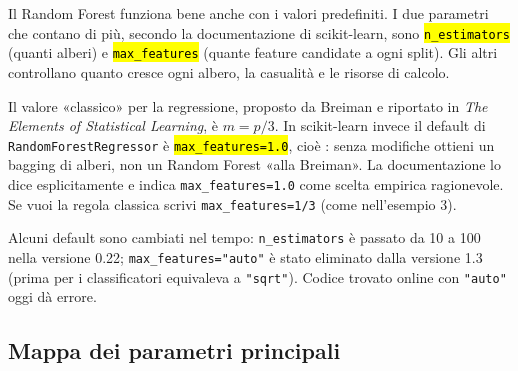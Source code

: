 
\begin{inbreve}
Il Random Forest funziona bene anche con i valori predefiniti. I due parametri che contano di più, secondo la documentazione di scikit-learn, sono \hl{\texttt{n\_estimators}} (quanti alberi) e \hl{\texttt{max\_features}} (quante feature candidate a ogni split). Gli altri controllano quanto cresce ogni albero, la casualità e le risorse di calcolo.
\end{inbreve}

\begin{attenzione}
Il valore «classico» per la regressione, proposto da Breiman e riportato in \emph{The Elements of Statistical Learning}, è $m=p/3$. In scikit-learn invece il default di \texttt{RandomForestRegressor} è \hl{\texttt{max\_features=1.0}}, cioè : senza modifiche ottieni un bagging di alberi, non un Random Forest «alla Breiman». La documentazione lo dice esplicitamente e indica \texttt{max\_features=1.0} come scelta empirica ragionevole. Se vuoi la regola classica scrivi \texttt{max\_features=1/3} (come nell'esempio 3).
\end{attenzione}

\begin{attenzione}
Alcuni default sono cambiati nel tempo: \texttt{n\_estimators} è passato da 10 a 100 nella versione 0.22; \texttt{max\_features="auto"} è stato eliminato dalla versione 1.3 (prima per i classificatori equivaleva a \texttt{"sqrt"}). Codice trovato online con \texttt{"auto"} oggi dà errore.
\end{attenzione}

\subsection{Mappa dei parametri principali}


